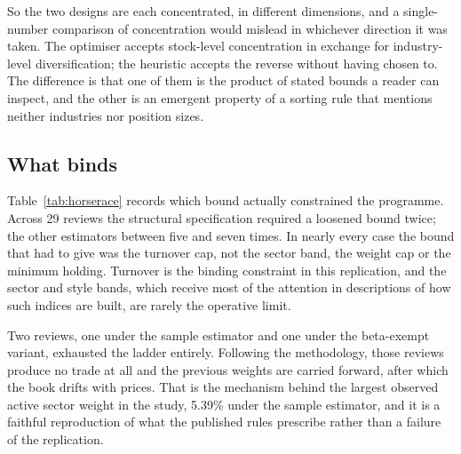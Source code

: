 So the two designs are each concentrated, in different dimensions, and a
single-number comparison of concentration would mislead in whichever direction
it was taken. The optimiser accepts stock-level concentration in exchange for
industry-level diversification; the heuristic accepts the reverse without
having chosen to. The difference is that one of them is the product of stated
bounds a reader can inspect, and the other is an emergent property of a sorting
rule that mentions neither industries nor position sizes.

\subsection{What binds}
Table~\ref{tab:horserace} records which bound actually constrained the
programme. Across 29 reviews the structural specification required a loosened
bound twice; the other estimators between five and seven times. In nearly every
case the bound that had to give was the turnover cap, not the sector band, the
weight cap or the minimum holding. Turnover is the binding constraint in this
replication, and the sector and style bands, which receive most of the
attention in descriptions of how such indices are built, are rarely the
operative limit.

Two reviews, one under the sample estimator and one under the beta-exempt
variant, exhausted the ladder entirely. Following the methodology, those
reviews produce no trade at all and the previous weights are carried forward,
after which the book drifts with prices. That is the mechanism behind the
largest observed active sector weight in the study, 5.39\% under the sample
estimator, and it is a faithful reproduction of what the published rules
prescribe rather than a failure of the replication.

